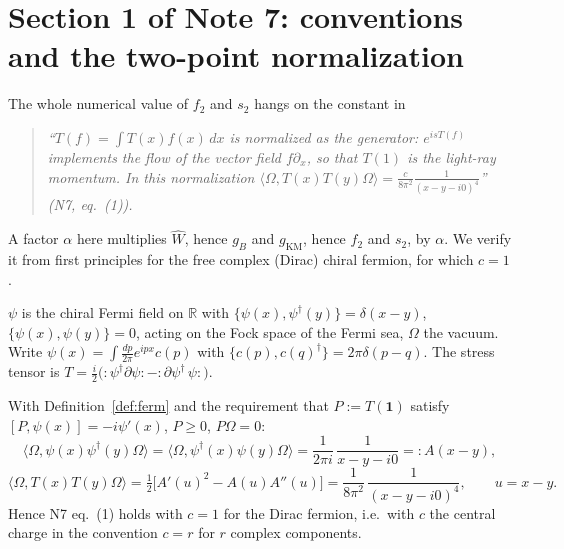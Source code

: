\documentclass[11pt]{article}
\begin{document}
\section{Section 1 of Note 7: conventions and the two-point normalization}\label{sec:conv}

The whole numerical value of $f_2$ and $s_2$ hangs on the constant in
\begin{quote}\itshape
``$T(f)=\int T(x)f(x)\,dx$ is normalized as the \emph{generator}: $e^{isT(f)}$ implements the flow of the vector
field $f\partial_x$, so that $T(1)$ is the light-ray momentum.  In this normalization
$\langle\Omega,T(x)T(y)\Omega\rangle=\frac{c}{8\pi^2}\frac1{(x-y-i0)^4}$'' \hfill (N7, eq.~(1)).
\end{quote}
A factor $\alpha$ here multiplies $\widehat W$, hence $g_B$ and $g_{\mathrm{KM}}$, hence $f_2$ and $s_2$, by
$\alpha$.  We verify it from first principles for the free complex (Dirac) chiral fermion, for which $c=1$.

\begin{definition}\label{def:ferm}
$\psi$ is the chiral Fermi field on $\mathbb R$ with $\{\psi(x),\psi^\dagger(y)\}=\delta(x-y)$,
$\{\psi(x),\psi(y)\}=0$, acting on the Fock space of the Fermi sea, $\Omega$ the vacuum.  Write
$\psi(x)=\int\frac{dp}{2\pi}e^{ipx}c(p)$ with $\{c(p),c(q)^\dagger\}=2\pi\delta(p-q)$.  The stress tensor is
$T=\tfrac i2\bigl(:\!\psi^\dagger\partial\psi\!:-:\!\partial\psi^\dagger\,\psi\!:\bigr)$.
\end{definition}

\begin{theorem}[Normalization of eq.~(1)]\label{thm:TT}
With Definition~\ref{def:ferm} and the requirement that $P:=T(\mathbf 1)$ satisfy $[P,\psi(x)]=-i\psi'(x)$,
$P\ge0$, $P\Omega=0$:
\begin{equation}\label{eq:v-prop}
 \langle\Omega,\psi(x)\psi^\dagger(y)\Omega\rangle=\langle\Omega,\psi^\dagger(x)\psi(y)\Omega\rangle
 =\frac1{2\pi i}\,\frac1{x-y-i0}=:A(x-y),
\end{equation}
\begin{equation}\label{eq:v-TT}
 \langle\Omega,T(x)T(y)\Omega\rangle=\tfrac12\bigl[A'(u)^2-A(u)A''(u)\bigr]=\frac1{8\pi^2}\,\frac1{(x-y-i0)^4},
 \qquad u=x-y .
\end{equation}
Hence N7 eq.~(1) holds with $c=1$ for the Dirac fermion, i.e.\ with $c$ the central charge in the convention
$c=r$ for $r$ complex components.
\end{theorem}
\end{document}
